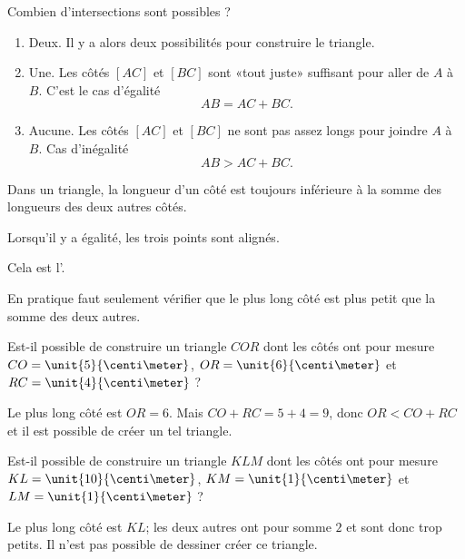 Combien d'intersections sont possibles ?
\begin{enumerate}
    \item
        Deux. Il y a alors deux possibilités pour construire le triangle.
    \item
        Une. Les côtés \( [AC]\) et \( [BC]\) sont «tout juste» suffisant pour aller de \( A\) à \( B\). C'est le cas d'égalité
        \begin{equation}
            AB=AC+BC.
        \end{equation}
    \item 
        Aucune. Les côtés \( [AC]\) et \( [BC]\) ne sont pas assez longs pour joindre \( A\) à \( B\). Cas d'inégalité
        \begin{equation}
            AB>AC+BC.
        \end{equation}
\end{enumerate}

\begin{Aretenir}
Dans un triangle, la longueur d'un côté est toujours inférieure à la somme des longueurs des deux autres côtés.

Lorsqu'il y a égalité, les trois points sont alignés.

Cela est l'.
\end{Aretenir}

En pratique faut seulement vérifier que le plus long côté est plus petit que la somme des deux autres.

\begin{example}
    Est-il possible de construire un triangle \( COR\) dont les côtés ont pour mesure \( CO=\unit{5}{\centi\meter}\), \( OR=\unit{6}{\centi\meter}\) et \( RC=\unit{4}{\centi\meter}\) ?

    Le plus long côté est \( OR=6\). Mais \( CO+RC=5+4=9\), donc \( OR<CO+RC\) et il est possible de créer un tel triangle.
\end{example}

\begin{example}
    Est-il possible de construire un triangle \( KLM\) dont les côtés ont pour mesure \( KL=\unit{10}{\centi\meter}\), \( KM=\unit{1}{\centi\meter}\) et \( LM=\unit{1}{\centi\meter}\) ?

    Le plus long côté est \( KL\); les deux autres ont pour somme \( 2\) et sont donc trop petits. Il n'est pas possible de dessiner créer ce triangle.

\begin{center}
   
\end{center}

\end{example}


